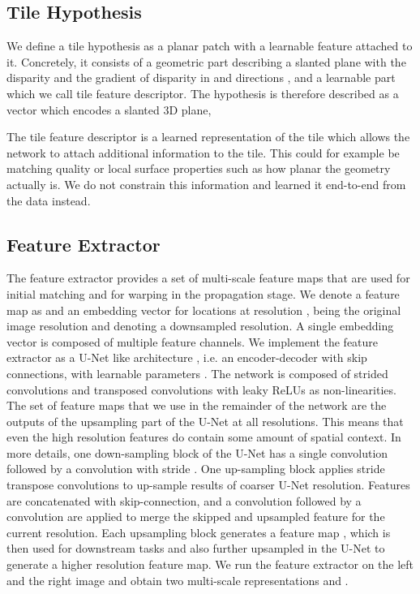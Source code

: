 \documentclass[final]{cvpr}
\begin{document}
\subsection{Tile Hypothesis}
\label{sec:tile_hypothesis}
We define a tile hypothesis as a planar patch with a learnable feature attached to it. Concretely, it consists of a geometric part describing a slanted plane with the disparity  and the gradient of disparity in  and  directions , and a learnable part  which we call tile feature descriptor. The hypothesis is therefore described as a vector which encodes a slanted 3D plane,

The tile feature descriptor is a learned representation of the tile which allows the network to attach additional information to the tile. This could for example be matching quality or local surface properties such as how planar the geometry actually is. We do not constrain this information and learned it end-to-end from the data instead.

\subsection{Feature Extractor}
\label{sec:feature_extractor}
The feature extractor provides a set of multi-scale feature maps  that are used for initial matching and for warping in the propagation stage. We denote a feature map as  and an embedding vector  for locations  at resolution ,  being the original image resolution and  denoting a   downsampled resolution. A single embedding vector  is composed of multiple feature channels. We implement the feature extractor  as a U-Net like architecture \cite{ronneberger2015u,long2015fully}, i.e. an encoder-decoder with skip connections, with learnable parameters . The network is composed of strided convolutions and transposed convolutions with leaky ReLUs as non-linearities. The set of feature maps  that we use in the remainder of the network are the outputs of the upsampling part of the U-Net at all resolutions. This means that even the high resolution features do contain some amount of spatial context. In more details, one down-sampling block of the U-Net has a single  convolution followed by a  convolution with stride . One up-sampling block applies  stride  transpose convolutions to up-sample results of coarser U-Net resolution. Features are concatenated with skip-connection, and a  convolution followed by a  convolution are applied to merge the skipped and upsampled feature for the current resolution. Each upsampling block generates a feature map , which is then used for downstream tasks and also further upsampled in the U-Net to generate a higher resolution feature map.
We run the feature extractor on the left and the right image and obtain two multi-scale representations  and .
\end{document}
